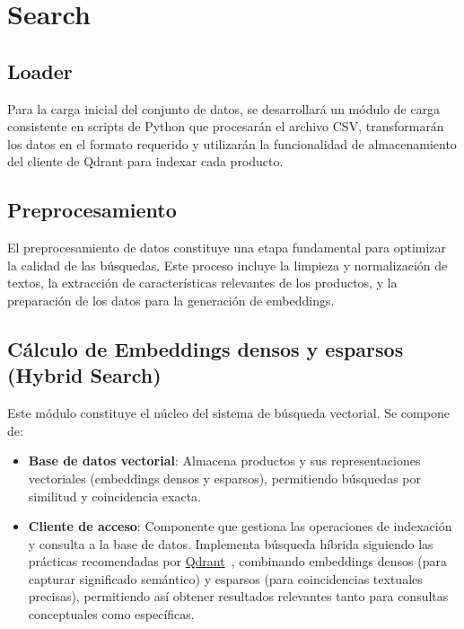 \section{Search}

\subsection{Loader}

Para la carga inicial del conjunto de datos, se desarrollará un módulo de carga consistente en scripts de Python que procesarán el archivo CSV, transformarán los datos en el formato requerido y utilizarán la funcionalidad de almacenamiento del cliente de Qdrant para indexar cada producto.

\subsection{Preprocesamiento}

El preprocesamiento de datos constituye una etapa fundamental para optimizar la calidad de las búsquedas. Este proceso incluye la limpieza y normalización de textos, la extracción de características relevantes de los productos, y la preparación de los datos para la generación de embeddings.

\subsection{Cálculo de Embeddings densos y esparsos (Hybrid Search)}

Este módulo constituye el núcleo del sistema de búsqueda vectorial. Se compone de:

\begin{itemize}
    \item \textbf{Base de datos vectorial}: Almacena productos y sus representaciones vectoriales (embeddings densos y esparsos), permitiendo búsquedas por similitud y coincidencia exacta.

    \item \textbf{Cliente de acceso}: Componente que gestiona las operaciones de indexación y consulta a la base de datos. Implementa búsqueda híbrida siguiendo las prácticas recomendadas por \href{https://qdrant.tech/documentation/search-precision/reranking-hybrid-search/}{Qdrant}~\cite{Qdrant}, combinando embeddings densos (para capturar significado semántico) y esparsos (para coincidencias textuales precisas), permitiendo así obtener resultados relevantes tanto para consultas conceptuales como específicas.
\end{itemize}

